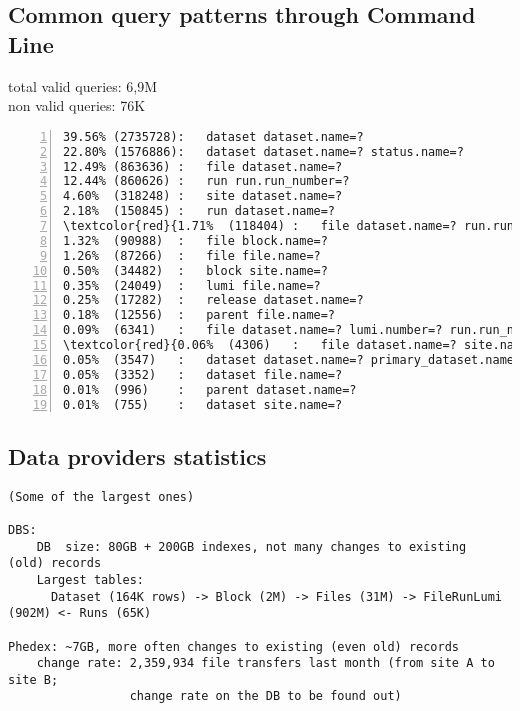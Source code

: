 \begin{appendix}
\subsection{Common query patterns through Command Line\label{appendix_das_cli_logs}}
total valid queries: 6,9M\\
non valid queries: 76K

\begin{Verbatim}[commandchars=\\\{\},numbers=left,numbersep=4pt]
39.56% (2735728):	dataset dataset.name=?
22.80% (1576886):	dataset dataset.name=? status.name=?
12.49% (863636) :	file dataset.name=?
12.44% (860626) :	run run.run_number=?
4.60%  (318248) :	site dataset.name=?
2.18%  (150845) :	run dataset.name=?
\textcolor{red}{1.71%  (118404) :	file dataset.name=? run.run_number=?}\label{run_dataset_heavy}
1.32%  (90988)  :	file block.name=?
1.26%  (87266)  :	file file.name=?
0.50%  (34482)  :	block site.name=?
0.35%  (24049)  :	lumi file.name=?
0.25%  (17282)  :	release dataset.name=?
0.18%  (12556)  :	parent file.name=?
0.09%  (6341)   :	file dataset.name=? lumi.number=? run.run_number=?
\textcolor{red}{0.06%  (4306)   :	file dataset.name=? site.name=?}\label{site_dataset_distr_heavy}
0.05%  (3547)   :	dataset dataset.name=? primary_dataset.name=? release.name=? tier.name=?
0.05%  (3352)   :	dataset file.name=?
0.01%  (996)    :	parent dataset.name=?
0.01%  (755)    :	dataset site.name=?
\end{Verbatim}


% 
%

\end{appendix}
\begin{appendix}
\section{Data providers statistics}
\begin{verbatim}
(Some of the largest ones)

DBS:
    DB  size: 80GB + 200GB indexes, not many changes to existing  (old) records
    Largest tables: 
      Dataset (164K rows) -> Block (2M) -> Files (31M) -> FileRunLumi (902M) <- Runs (65K)

Phedex: ~7GB, more often changes to existing (even old) records
    change rate: 2,359,934 file transfers last month (from site A to site B; 
                 change rate on the DB to be found out)
\end{verbatim}
\end{appendix}
